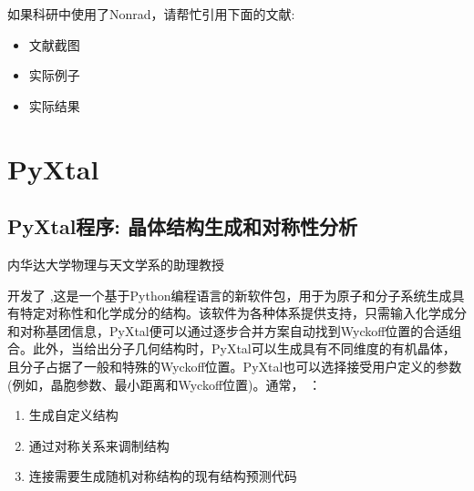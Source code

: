 \documentclass[a4paper,12pt,english]{sphinxmanual}
\begin{document}
\sphinxAtStartPar
如果科研中使用了Nonrad，请帮忙引用下面的文献: %
\begin{footnote}[5]\sphinxAtStartFootnote
{}
%
\end{footnote}
\begin{itemize}
\item {} 
\sphinxAtStartPar
文献截图

\end{itemize}

\noindent{}
\begin{itemize}
\item {} 
\sphinxAtStartPar
实际例子

\end{itemize}

\noindent{}
\begin{itemize}
\item {} 
\sphinxAtStartPar
实际结果

\end{itemize}

\noindent{}


\section{PyXtal}
\label{\detokenize{code:pyxtal}}

\subsection{PyXtal程序: 晶体结构生成和对称性分析}
\label{\detokenize{code/PyXtal:pyxtal}}\label{\detokenize{code/PyXtal::doc}}
\sphinxAtStartPar
{}

\sphinxAtStartPar
内华达大学物理与天文学系的助理教授  %
\begin{footnote}[6]\sphinxAtStartFootnote
{}
%
\end{footnote} 开发了 ,这是一个基于Python编程语言的新软件包，用于为原子和分子系统生成具有特定对称性和化学成分的结构。该软件为各种体系提供支持，只需输入化学成分和对称基团信息，PyXtal便可以通过逐步合并方案自动找到Wyckoff位置的合适组合。此外，当给出分子几何结构时，PyXtal可以生成具有不同维度的有机晶体，且分子占据了一般和特殊的Wyckoff位置。PyXtal也可以选择接受用户定义的参数(例如，晶胞参数、最小距离和Wyckoff位置)。通常， ：
\begin{enumerate}
%
\item {} 
\sphinxAtStartPar
生成自定义结构

\item {} 
\sphinxAtStartPar
通过对称关系来调制结构

\item {} 
\sphinxAtStartPar
连接需要生成随机对称结构的现有结构预测代码

\end{enumerate}
\end{document}
